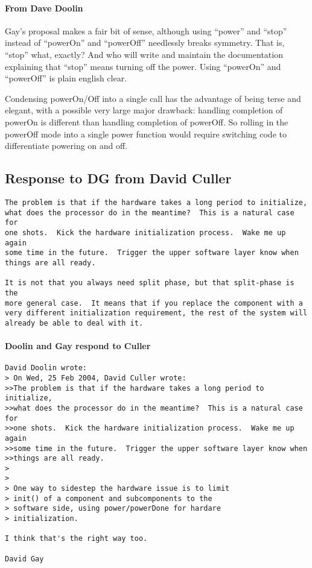 \documentclass[10pt]{article}
\begin{document}
\paragraph{From Dave Doolin}  Gay's proposal makes a fair bit
of sense, although using ``power'' and ``stop'' instead 
of ``powerOn'' and ``powerOff''
needlessly breaks symmetry.  That is, ``stop'' what, exactly?
And who will write and maintain the documentation explaining 
that ``stop'' means turning off the power.
Using ``powerOn'' and ``powerOff'' is plain english clear.


Condensing powerOn/Off into a single call has the advantage 
of being terse and elegant, with a possible very large 
major drawback: handling completion of powerOn is different 
than handling completion of powerOff.  So rolling in the 
powerOff mode into a single power function would require 
switching code to differentiate powering on and off.


\subsection{Response to DG from David Culler}

\begin{verbatim}
The problem is that if the hardware takes a long period to initialize,
what does the processor do in the meantime?  This is a natural case for
one shots.  Kick the hardware initialization process.  Wake me up again
some time in the future.  Trigger the upper software layer know when
things are all ready.

It is not that you always need split phase, but that split-phase is the
more general case.  It means that if you replace the component with a
very different initialization requirement, the rest of the system will
already be able to deal with it.
\end{verbatim}

\paragraph{Doolin and Gay respond to Culler}

\begin{verbatim}
David Doolin wrote:
> On Wed, 25 Feb 2004, David Culler wrote:
>>The problem is that if the hardware takes a long period to initialize,
>>what does the processor do in the meantime?  This is a natural case for
>>one shots.  Kick the hardware initialization process.  Wake me up again
>>some time in the future.  Trigger the upper software layer know when
>>things are all ready.
>
>
> One way to sidestep the hardware issue is to limit
> init() of a component and subcomponents to the
> software side, using power/powerDone for hardare
> initialization.

I think that's the right way too.

David Gay
\end{verbatim}
\end{document}
